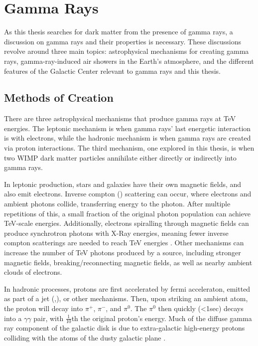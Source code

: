 \cleartooddpage[\thispagestyle{empty}]
\chapter{Gamma Rays}

As this thesis searches for dark matter from the presence of gamma rays, a discussion on gamma rays and their properties is necessary.
These discussions revolve around three main topics: astrophysical mechanisms for creating gamma rays, gamma-ray-induced air showers in the Earth's atmosphere, and the different features of the Galactic Center relevant to gamma rays and this thesis.


\section{Methods of Creation}

  There are three astrophysical mechanisms that produce gamma rays at TeV energies.
  The leptonic mechanism is when gamma rays' last energetic interaction is with electrons, while the hadronic mechanism is when gamma rays are created via proton interactions.
  The third mechanism, one explored in this thesis, is when two WIMP dark matter particles annihilate either directly or indirectly into gamma rays.

  In leptonic production, stars and galaxies have their own magnetic fields, and also emit electrons.
  Inverse compton (\cite{compton_effect}) scattering can occur, where electrons and ambient photons collide, transferring energy to the photon.
  After multiple repetitions of this, a small fraction of the original photon population can achieve TeV-scale energies.
  Additionally, electrons spiralling through magnetic fields can produce synchrotron photons with X-Ray energies, meaning fewer inverse compton scatterings are needed to reach TeV energies \cite{self_compton}.
  Other mechanisms can increase the number of TeV photons produced by a source, including stronger magnetic fields, breaking/reconnecting magnetic fields, as well as nearby ambient clouds of electrons.

  In hadronic processes, protons are first accelerated by fermi acceleraton, emitted as part of a jet (\cite{hadronic1},\cite{hadronic2}), or other mechanisms.
  Then, upon striking an ambient atom, the proton will decay into $\pi^{+}$, $\pi^{-}$, and $\pi^{0}$.
  The $\pi^{0}$ then quickly (<1sec) decays into a $\gamma\gamma$ pair, with \nicetilde $\frac{1}{10}$th the original proton's energy.
  Much of the diffuse gamma ray component of the galactic disk is due to extra-galactic high-energy protons colliding with the atoms of the dusty galactic plane \cite{GalacticDiffuseGammaRays}.


